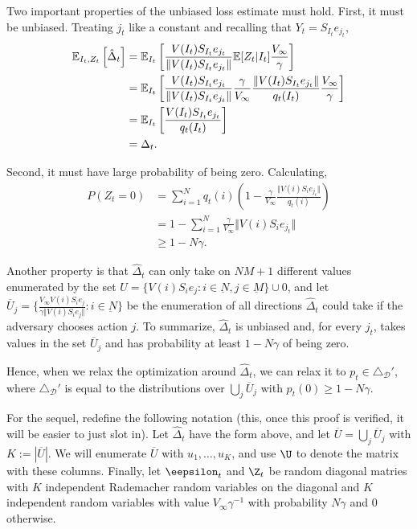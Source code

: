 \documentclass{article}
\begin{document}
Two important properties of the unbiased loss estimate must hold. First, it must be unbiased. Treating $j_t$ like a constant and recalling that $Y_t = S_{I_t} e_{j_t}$,
\begin{align*}
  \mathbb E_{I_t, Z_t}\left[ \hat\Delta_t \right]
  &=
    \mathbb E_{I_t}\left[
    \frac{V(I_t) S_{I_t} e_{j_t}}{\Vert V(I_t) S_{I_t} e_{j_t} \Vert}  \mathbb E[Z_t|I_t] \frac{ V_\infty}{\gamma}
    \right]
  \\
  &=
    \mathbb E_{I_t}\left[
    \frac{V(I_t) S_{I_t} e_{j_t}}{\Vert V(I_t) S_{I_t} e_{j_t}\Vert}  \frac{\gamma}{V_\infty} \frac{\Vert V(I_t) S_{I_t} e_{j_t} \Vert}{q_t(I_t)}
    \frac{ V_\infty}{\gamma}
    \right]
  \\
  &=
    \mathbb E_{I_t}\left[
    \frac{V(I_t) S_{I_t} e_{j_t}}{q_t(I_t)}
    \right]
  \\
  &=
    \Delta_t.
\end{align*}

Second, it must have large probability of being zero. Calculating,
\begin{align*}
  P(Z_t = 0)
  &=
    \sum_{i=1}^N
    q_t(i)
    \left( 1 - \frac{\gamma}{V_\infty} \frac{\Vert V(i) S_i e_{j_t} \Vert}{q_t(i)} \right)
  \\
  &=
    1-
    \sum_{i=1}^N
    \frac{\gamma}{V_\infty} \Vert V(i)S_i e_{j_t}  \Vert
  \\
  &\geq
  1-N \gamma.
\end{align*}


Another property is that $\hat\Delta_t$ can only take on $NM+1$ different values enumerated by the set $U = \{ V(i) S_i e_j: i\in\underbar N, j \in\underbar M\}\cup 0$, and let $\overline U_j = \{ \frac{V_\infty V(i)S_i e_j}{\gamma \Vert V(i)S_i e_j \Vert}: i\in\underbar N \}$ be the enumeration of all directions $\hat\Delta_t$ could take if the adversary chooses action $j$. To summarize, $\hat\Delta_t$ is unbiased  and, for every $j_t$, takes values in the set
$\overline U_j$ and has probability at least $1-N\gamma$ of being zero.

Hence, when we relax the optimization around $\hat\Delta_t$, we can relax it to $p_t \in \triangle_{\mathcal D}'$, where $\triangle_{\mathcal D}'$ is equal to the distributions over $\bigcup_j \overline U_j$ with $p_t(0) \geq 1-N\gamma$.

For the sequel, redefine the following notation (this, once this proof is verified, it will be easier to just slot in).
Let $\hat\Delta_t$ have the form above, and let $\overline U = \bigcup_j \overline U_j$ with $K := |\overline U|$. We will enumerate $\overline U$ with $u_1,\ldots, u_K$, and use $\U$ to denote the matrix with these columns. Finally, let $\eepsilon_t$ and $\Z_t$ be random diagonal matries with $K$ independent Rademacher random variables on the diagonal and $K$ independent random variables with value $V_\infty \gamma^{-1}$ with probability $N\gamma$ and $0$ otherwise.
\end{document}
